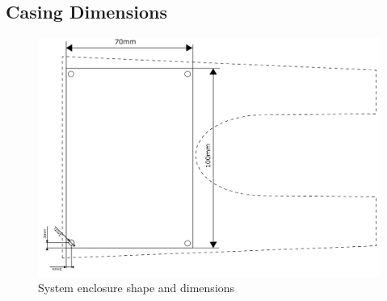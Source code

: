 \subsection{Casing Dimensions}
\begin{figure}[htb]
	\centering
    \includegraphics[width=\linewidth]{Figures/casing_dimensions.png}
	\caption{System enclosure shape and dimensions}
	\label{fig:casdim}
\end{figure}


